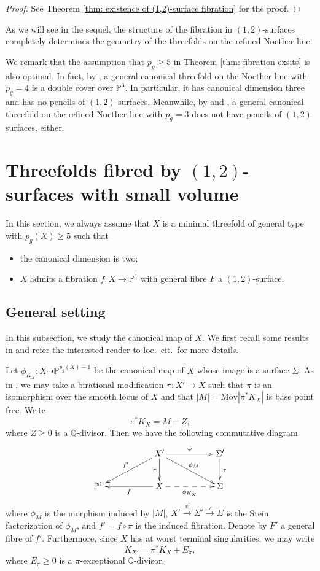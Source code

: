 \documentclass[a4paper,11pt]{amsart}
\newcommand{\PP}{\ensuremath{\mathbb{P}}}
\theoremstyle{definition}
\theoremstyle{remark}
\numberwithin{equation}{section}
\begin{document}
\begin{proof}
    See Theorem \ref{thm: existence of (1,2)-surface fibration} for the proof.
\end{proof}

As we will see in the sequel, the structure of the fibration in $(1, 2)$-surfaces completely determines the geometry of the threefolds on the refined Noether line.

We remark that the assumption that $p_g \ge 5$ in Theorem \ref{thm: fibration exsits} is also optimal. In fact, by \cite[Theorem 1.5]{CHJ}, a general canonical threefold on the Noether line with $p_g=4$ is a double cover over $\PP^3$. In particular, it has canonical dimension three and has no pencils of $(1, 2)$-surfaces. Meanwhile, by \cite[Example 3.1]{CH2} and \cite[Theorem 1.6]{CHJ}, a general canonical threefold on the refined Noether line with $p_g = 3$ does not have pencils of $(1, 2)$-surfaces, either.


\section{Threefolds fibred by \texorpdfstring{$(1,2)$}{(1, 2)}-surfaces with small volume} \label{section: fibration}

In this section, we always assume that $X$ is a minimal threefold of general type with $p_g(X) \ge 5$ such that 
\begin{itemize}
	\item [(1)] the canonical dimension is two;
	\item [(2)] $X$ admits a fibration $f\colon X \to \PP^1$ with general fibre $F$ a $(1, 2)$-surface.
\end{itemize}

\subsection{General setting}\label{setting}
In this subsection, we study the canonical map of $X$. We first recall some results in \cite[\S 3]{HZ} and refer the interested reader to loc.~cit.~for more details.

Let $\phi_{K_X}\colon X \dashrightarrow \PP^{p_g(X) - 1}$ be the canonical map of $X$ whose image is a surface $\Sigma$. As in \cite[\S 3.1]{HZ}, we may take a birational modification $\pi\colon X' \to X$ such that $\pi$ is an isomorphism over the smooth locus of $X$ and that $|M| = \mathrm{Mov}|\pi^*K_X|$ is base point free. Write
$$
\pi^*K_X = M + Z,
$$
where $Z \ge 0$ is a $\mathbb{Q}$-divisor. Then we have the following commutative diagram
$$
\xymatrix{
	& & X' \ar[d]_{\pi} \ar[lld]_{f'} \ar[rr]^{\psi} \ar[drr]^{\phi_{M}} & &  \Sigma' \ar[d]^{\tau}  \\
	\PP^1 & & X  \ar@{-->}[rr]_{\phi_{K_X}} \ar[ll]^f  & & \Sigma
}
$$
where $\phi_M$ is the morphism induced by $|M|$, $X' \stackrel {\psi}\rightarrow \Sigma' \stackrel{\tau} \rightarrow \Sigma$ is the Stein factorization of $\phi_M$, and $f' = f \circ \pi$ is the induced fibration. Denote by $F'$ a general fibre of $f'$. Furthermore, since $X$ has at worst terminal singularities, we may write
$$
K_{X'} = \pi^*K_X + E_\pi,
$$
where $E_\pi \ge 0$ is a $\pi$-exceptional $\mathbb{Q}$-divisor.
\end{document}
